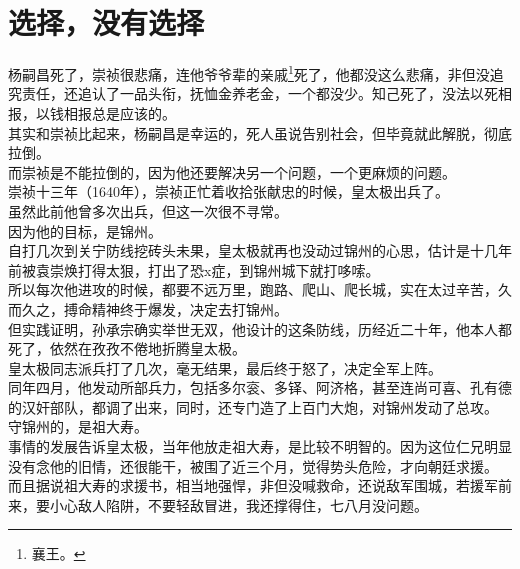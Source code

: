 \section{选择，没有选择}
\ifnum{}
	\begin{multicols}{\theparacolNo}
\fi
杨嗣昌死了，崇祯很悲痛，连他爷爷辈的亲戚\footnote{襄王。}死了，他都没这么悲痛，非但没追究责任，还追认了一品头衔，抚恤金养老金，一个都没少。知己死了，没法以死相报，以钱相报总是应该的。\\

其实和崇祯比起来，杨嗣昌是幸运的，死人虽说告别社会，但毕竟就此解脱，彻底拉倒。\\

而崇祯是不能拉倒的，因为他还要解决另一个问题，一个更麻烦的问题。\\

崇祯十三年（1640年），崇祯正忙着收拾张献忠的时候，皇太极出兵了。\\

虽然此前他曾多次出兵，但这一次很不寻常。\\

因为他的目标，是锦州。\\

自打几次到关宁防线挖砖头未果，皇太极就再也没动过锦州的心思，估计是十几年前被袁崇焕打得太狠，打出了恐x症，到锦州城下就打哆嗦。\\

所以每次他进攻的时候，都要不远万里，跑路、爬山、爬长城，实在太过辛苦，久而久之，搏命精神终于爆发，决定去打锦州。\\

但实践证明，孙承宗确实举世无双，他设计的这条防线，历经近二十年，他本人都死了，依然在孜孜不倦地折腾皇太极。\\

皇太极同志派兵打了几次，毫无结果，最后终于怒了，决定全军上阵。\\

同年四月，他发动所部兵力，包括多尔衮、多铎、阿济格，甚至连尚可喜、孔有德的汉奸部队，都调了出来，同时，还专门造了上百门大炮，对锦州发动了总攻。\\

守锦州的，是祖大寿。\\

事情的发展告诉皇太极，当年他放走祖大寿，是比较不明智的。因为这位仁兄明显没有念他的旧情，还很能干，被围了近三个月，觉得势头危险，才向朝廷求援。\\

而且据说祖大寿的求援书，相当地强悍，非但没喊救命，还说敌军围城，若援军前来，要小心敌人陷阱，不要轻敌冒进，我还撑得住，七八月没问题。\\


\end{multicols}
